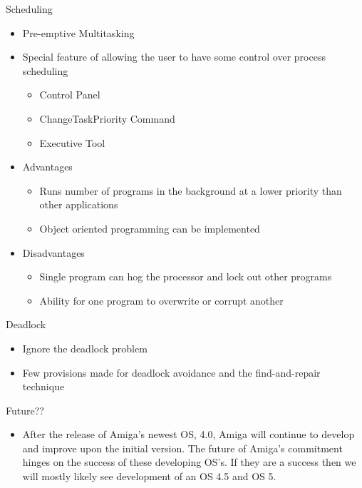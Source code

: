 \documentclass{beamer}
\begin{document}
\begin{frame}{Scheduling}
  \begin{itemize}
  	\item Pre-emptive Multitasking
\item Special feature of allowing the user to have some control over process scheduling
\begin{itemize}
\item Control Panel
\item ChangeTaskPriority Command
\item Executive Tool

\end{itemize}
\item Advantages
\begin{itemize}
\item Runs number of programs in the background at a lower priority than other applications
\item Object oriented programming can be implemented
\end{itemize}
\item Disadvantages
\begin{itemize}
\item Single program can hog the processor and lock out other programs
\item Ability for one program to
overwrite or corrupt another
\end{itemize}
\end{itemize}
\end{frame}



\begin{frame}{Deadlock}
  \begin{itemize}
  	\item Ignore the deadlock problem
\item Few provisions made for deadlock avoidance and the find-and-repair technique
\end{itemize}
\end{frame}

\begin{frame}{Future??}
  \begin{itemize}
  	\item After the release of Amiga’s newest OS, 4.0, Amiga will continue to develop and
improve upon the initial version. The future of Amiga’s commitment hinges on the
success of these developing OS’s. If they are a success then we will mostly likely see
development of an OS 4.5 and OS 5.

\end{itemize}
\end{frame}
\end{document}
